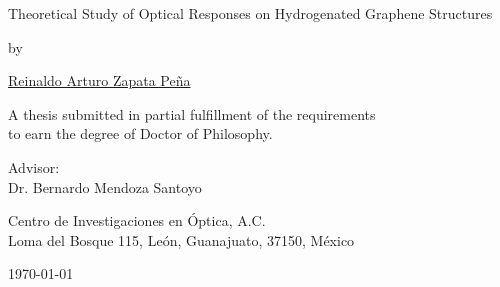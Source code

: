 \begin{titlingpage*}

\let\cleardoublepage\clearpage

\begin{center}

\vspace*{2cm}

{\Huge Theoretical Study of Optical Responses on Hydrogenated Graphene Structures}
\vspace{1.0cm}

{\large by}
\vspace{1.0cm}

{\LARGE \href{mailto:reinaldo.zapata.p@gmail.com}{Reinaldo Arturo Zapata
Pe\~na}}
\vspace{3cm}

{\Large A thesis submitted in partial fulfillment of the requirements\\
\vspace{0.25cm}
to earn the degree of Doctor of Philosophy.}
\vspace{4cm}

{\large Advisor:\\
Dr. Bernardo Mendoza Santoyo
\vspace*{1cm}

Centro de Investigaciones en \'Optica, A.C.\\
Loma del Bosque 115, Le\'on, Guanajuato, 37150, M\'exico}

\vfill

{\today}

\end{center}

\end{titlingpage*}
